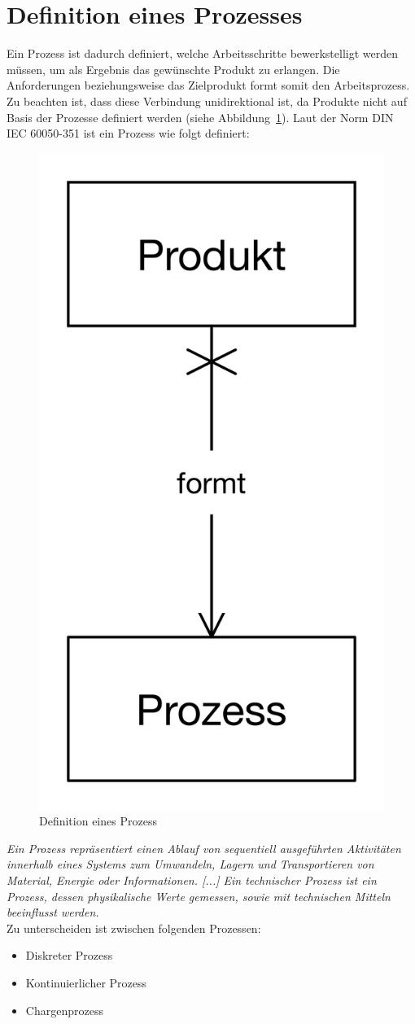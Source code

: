 	\newpage
	\section{Definition eines Prozesses}
	Ein Prozess ist dadurch definiert, welche Arbeitsschritte bewerkstelligt werden müssen, um als Ergebnis das gewünschte Produkt zu erlangen. Die Anforderungen beziehungsweise das Zielprodukt formt somit den Arbeitsprozess. Zu beachten ist, dass diese Verbindung unidirektional ist, da Produkte nicht auf Basis der Prozesse definiert werden (siehe Abbildung~\ref{fig:prozessdef}). Laut der Norm \acs{DIN} \acs{IEC} 60050-351 ist ein Prozess wie folgt definiert:\\
	
	\begin{figure}[h!]
  		\centering
		\includegraphics[height=0.5\textwidth]{graphics/stateoftheart/Prozess.png}
		\caption{Definition eines Prozess}
	  	\label{fig:prozessdef}		
	\end{figure}
	
	\textit{Ein Prozess repräsentiert einen Ablauf von sequentiell ausgeführten Aktivitäten innerhalb eines Systems zum Umwandeln, Lagern und Transportieren von Material, Energie oder Informationen. [...] Ein technischer Prozess ist ein Prozess, dessen physikalische Werte gemessen, sowie mit technischen Mitteln beeinflusst werden.}\cite{mpolke_proc}\\
	
	Zu unterscheiden ist zwischen folgenden Prozessen:
	
	\begin{itemize}
		\item Diskreter Prozess
		\item Kontinuierlicher Prozess
		\item Chargenprozess
	\end{itemize}
	
